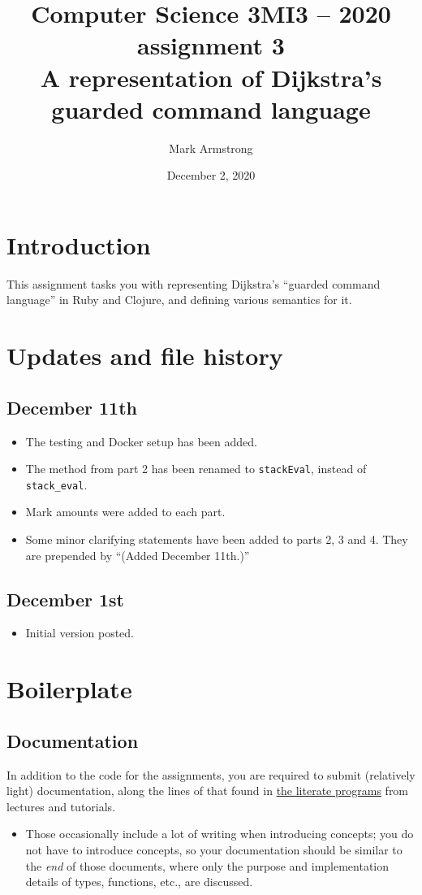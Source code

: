 \documentclass[11pt]{article}
\author{Mark Armstrong}
\date{December 2, 2020}
\title{Computer Science 3MI3 – 2020 assignment 3\\\medskip
\large A representation of Dijkstra's guarded command language}
\theoremstyle{definition}
\begin{document}
\maketitle
\tableofcontents


\section*{Introduction}
\label{sec:org80bd3ef}
This assignment tasks you with representing
Dijkstra's “guarded command language” in
Ruby and Clojure,
and defining various semantics for it.

\section*{Updates and file history}
\label{sec:orgfc88c9a}
\subsection*{December 11th}
\label{sec:org3bbed87}
\begin{itemize}
\item The testing and Docker setup has been added.
\item The method from part 2 has been renamed to \texttt{stackEval},
instead of \texttt{stack\_eval}.
\item Mark amounts were added to each part.
\item Some minor clarifying statements have been added to parts 2, 3 and 4.
They are prepended by “(Added December 11th.)”
\end{itemize}

\subsection*{December 1st}
\label{sec:orgece2f8b}
\begin{itemize}
\item Initial version posted.
\end{itemize}

\section*{Boilerplate}
\label{sec:org2d0f47d}
\subsection*{Documentation}
\label{sec:org9155523}
In addition to the code for the assignments,
you are required to submit (relatively light) documentation,
along the lines of that found in
\href{https://armkeh.github.io/principles-of-programming-languages/\#outline-container-Lecture-literate-programs}{the literate programs}
from lectures and tutorials.
\begin{itemize}
\item Those occasionally include a lot of writing when introducing concepts;
you do not have to introduce concepts, so your documentation
should be similar to the \emph{end} of those documents,
where only the purpose and implementation details
of types, functions, etc., are discussed.
\end{itemize}
\end{document}
